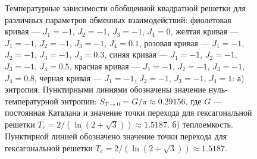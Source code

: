 \documentclass[utf8,12pt]{jetp}
\begin{document}
\begin{figure}[h]
	\begin{minipage}[h]{0.5\linewidth}
	\end{minipage}
	\hfill
	\begin{minipage}[h]{0.5\linewidth}
	\end{minipage}
	\caption{Температурные зависимости обобщенной квадратной решетки для различных параметров обменных взаимодействий: фиолетовая кривая --- $J_1 = -1$, $J_2 = -1$, $J_3 = -1$, $J_4 = 0$, желтая кривая --- $J_1 = -1$, $J_2 = -1$, $J_3 = -1$, $J_4 = 0.1$, розовая кривая --- $J_1 = -1$, $J_2 = -1$, $J_3 = -1$, $J_4 = 0.3$, синяя кривая --- $J_1 = -1$, $J_2 = -1$, $J_3 = -1$, $J_4 = 0.5$, красная кривая --- $J_1 = -1$, $J_2 = -1$, $J_3 = -1$, $J_4 = 0.8$, черная кривая --- $J_1 = -1$, $J_2 = -1$, $J_3 = -1$, $J_4 = 1$: а) энтропия. Пунктирными линиями обозначены значение нуль-температурной энтропии: $S_{T\rightarrow 0} = G/\pi\approx 0.29156$, где $G$ --- постоянная Каталана и значение точки перехода для гексагональной решетки $T_c = 2/(\ln(2+\sqrt{3}))\approx 1.5187$. б) теплоемкость. Пунктирной линией обозначено значение точки перехода для гексагональной решетки $T_c = 2/(\ln(2+\sqrt{3}))\approx 1.5187$. }
	\label{Peak2}
\end{figure}
\end{document}

